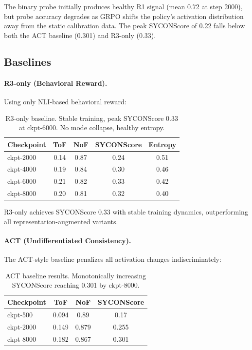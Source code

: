 \documentclass[11pt,a4paper]{article}
\begin{document}
The binary probe initially produces healthy R1 signal (mean 0.72 at step 2000), but probe accuracy degrades as GRPO shifts the policy's activation distribution away from the static calibration data. The peak SYCONScore of 0.22 falls below both the ACT baseline (0.301) and R3-only (0.33).

\subsection{Baselines}

\paragraph{R3-only (Behavioral Reward).} Using only NLI-based behavioral reward:

\begin{table}[h]
\centering
\small
\begin{tabular}{lcccc}
\toprule
\textbf{Checkpoint} & \textbf{ToF} & \textbf{NoF} & \textbf{SYCONScore} & \textbf{Entropy} \\
\midrule
ckpt-2000 & 0.14 & 0.87 & 0.24 & 0.51 \\
ckpt-4000 & 0.19 & 0.84 & 0.30 & 0.46 \\
ckpt-6000 & 0.21 & 0.82 & 0.33 & 0.42 \\
ckpt-8000 & 0.20 & 0.81 & 0.32 & 0.40 \\
\bottomrule
\end{tabular}
\caption{R3-only baseline. Stable training, peak SYCONScore 0.33 at ckpt-6000. No mode collapse, healthy entropy.}
\label{tab:r3_only}
\end{table}

R3-only achieves SYCONScore 0.33 with stable training dynamics, outperforming all representation-augmented variants.

\paragraph{ACT (Undifferentiated Consistency).} The ACT-style baseline penalizes all activation changes indiscriminately:

\begin{table}[h]
\centering
\small
\begin{tabular}{lccc}
\toprule
\textbf{Checkpoint} & \textbf{ToF} & \textbf{NoF} & \textbf{SYCONScore} \\
\midrule
ckpt-500 & 0.094 & 0.89 & 0.17 \\
ckpt-2000 & 0.149 & 0.879 & 0.255 \\
ckpt-8000 & 0.182 & 0.867 & 0.301 \\
\bottomrule
\end{tabular}
\caption{ACT baseline results. Monotonically increasing SYCONScore reaching 0.301 by ckpt-8000.}
\label{tab:act}
\end{table}
\end{document}

